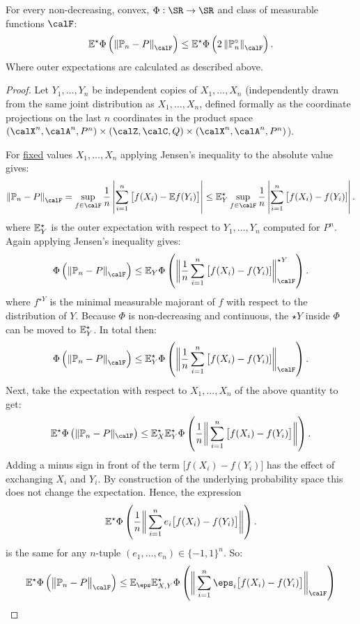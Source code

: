 \begin{lemma}[Symmetrization]
	\label{lemma:vdv2.3.1}
	For every non-decreasing, convex, \(\Phi:\SR\to\SR\) and class of measurable functions \(\calF\):
	\[
	    \E^\star\Phi\left(\left\|\P_n-P\right\|_\calF\right)\leq \E^\star\Phi\left(2\left\|\P_n^\circ\right\|_\calF\right)
	.\]
	Where outer expectations are calculated as described above.
\end{lemma}
\begin{proof}
	Let \(Y_1,\dots,Y_n\) be independent copies of \(X_1,\dots,X_n\) (independently drawn from the same joint distribution as \(X_1,\dots,X_n\), defined formally as the coordinate projections on the last \(n\) coordinates in the product space  \((\calX^n,\calA^n,P^n)\times(\calZ,\calC,Q)\times(\calX^n,\calA^n,P^n)\)). 

	For \underline{fixed} values \(X_1,\dots,X_n\) applying Jensen's inequality to the absolute value gives:
	\[
		\left\|\P_n-P\right\|_\calF = \sup_{f\in\calF}\frac{1}{n}\left|\sum_{i=1}^n \big[f(X_i)-\E f(Y_i)\big]\right|\leq \E^\star_Y \sup_{f\in\calF} \frac{1}{n}\left|\sum_{i=1}^n \big[f(X_i)-f(Y_i)]\right| 
	.\] 
	where \(\mathbb{E}_Y^\star\) is the outer expectation with respect to \(Y_1,\dots,Y_n\) computed for \(P^n\). Again applying Jensen's inequality gives:
	 \[
		 \Phi\left(\left\|\P_n-P\right\|_\calF\right)\leq \E_Y\Phi\left(\bigg\|\frac{1}{n}\sum_{i=1}^n \big[f(X_i)-f(Y_i)] \bigg\|_\calF^{\star Y}\right)
	.\]
	where \(f^{\star Y}\) is the minimal measurable majorant of  \(f\) with respect to the distribution of  \(Y\). Because  \(\Phi\) is non-decreasing and continuous, the  \(\star Y\) inside  \(\Phi\) can be moved to  \(\mathbb{E}^\star_Y\). In total then:	 \[
		\Phi\left(\left\|\P_n-P\right\|_\calF\right)\leq \E_Y^{\star}\Phi\left(\bigg\|\frac{1}{n}\sum_{i=1}^n \big[f(X_i)-f(Y_i)] \bigg\|_\calF\right)
	.\]
	Next, take the expectation with respect to \(X_1,\dots,X_n\) of the above quantity to get:
	\[
		\E^\star\Phi\left(\|\P_n-P\|_\calF\right) \leq \E_X^\star\E_Y^\star\Phi\left(\frac{1}{n}\bigg\|\sum_{i=1}^n \big[f(X_i)-f(Y_i)\big]\bigg\| \right)
	.\]
	Adding a minus sign in front of the term \(\big[f(X_i)-f(Y_i)\big]\) has the effect of exchanging  \(X_i\) and \(Y_i\). By construction of the underlying probability space this does not change the expectation. Hence, the expression
	 \[
	    \mathbb{E}^\star\Phi\left(\frac{1}{n}\bigg\|\sum_{i=1}^n e_i\big[f(X_i)-f(Y_i)\big]\bigg\| \right)
	.\]
	is the same for any \(n\)-tuple  \((e_1,\dots,e_n)\in\{-1,1\}^n\). So:
	\[
		\E^\star\Phi\left(\big\|\P_n-P\big\|_\calF\right)\leq \E_\eps\E^\star_{X,Y}\Phi\left(\bigg\|\sum_{i=1}^n \eps_i\big[f(X_i)-f(Y_i)\big]\bigg\|_\calF\right)
\]
\end{proof}
